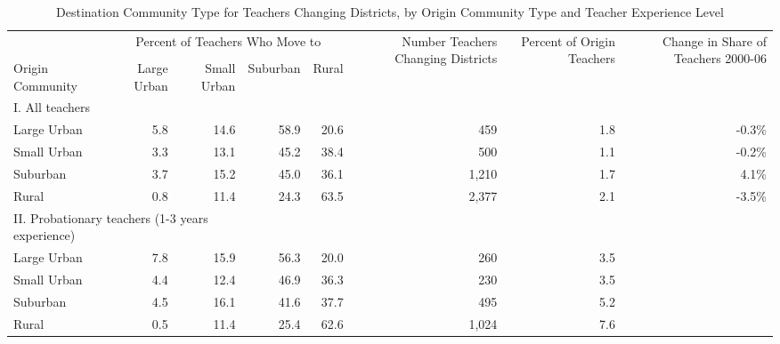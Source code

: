 \documentclass[]{article}
\begin{document}
\begin{sidewaystable}[ht]
\centering
\begin{tabular}{lrrrrrrr}
  \hline
 & \multicolumn{4}{c}{\multirow{2}{*}{Percent of Teachers Who Move to}} & \multirow{4}{*}{\parbox{0.13\linewidth}{Number Teachers Changing Districts}} & \multirow{4}{*}{\parbox{0.12\linewidth}{Percent of Origin Teachers}} & \multirow{4}{*}{\parbox{0.16\linewidth}{Change in Share of Teachers 2000-06}}\\
 & \multicolumn{4}{c}{} & & & \\ \cline{2-5}
& & & & & & & \\
Origin Community & Large Urban & Small Urban & Suburban & Rural &  &  &  \\ 
  \hline
I. All teachers & & & & & & & \\
\quad Large Urban & 5.8 & 14.6 & 58.9 & 20.6 & 459 & 1.8 & -0.3\% \\ 
  \quad Small Urban & 3.3 & 13.1 & 45.2 & 38.4 & 500 & 1.1 & -0.2\% \\ 
  \quad Suburban & 3.7 & 15.2 & 45.0 & 36.1 & 1,210 & 1.7 & 4.1\% \\ 
  \quad Rural & 0.8 & 11.4 & 24.3 & 63.5 & 2,377 & 2.1 & -3.5\% \\ 
\multicolumn{3}{l}{II. Probationary teachers (1-3 years experience)} & & & & & \\
  \quad Large Urban & 7.8 & 15.9 & 56.3 & 20.0 & 260 & 3.5 &  \\ 
  \quad Small Urban & 4.4 & 12.4 & 46.9 & 36.3 & 230 & 3.5 &  \\ 
  \quad Suburban & 4.5 & 16.1 & 41.6 & 37.7 & 495 & 5.2 &  \\ 
  \quad Rural & 0.5 & 11.4 & 25.4 & 62.6 & 1,024 & 7.6 &  \\ 
   \hline
\end{tabular}
\caption{Destination Community Type for Teachers Changing Districts, by Origin Community Type and Teacher Experience Level} 
\label{tbl:markov}
\end{sidewaystable}
\end{document}
